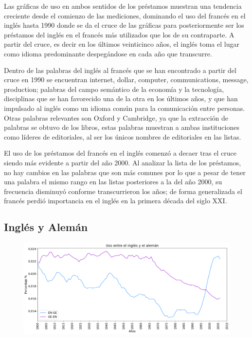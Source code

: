 Las gráficas de uso en ambos sentidos de los préstamos muestran una tendencia creciente desde el comienzo de las mediciones,  dominando el uso del francés en el inglés hasta 1990 donde se da el cruce de las gráficas para posteriormente ser los préstamos del inglés en el francés más utilizados que los de su contraparte.  A partir del cruce, es decir en los últimos veinticinco años, el inglés toma el lugar como idioma predominante despegándose en cada año que transcurre. 

Dentro de las palabras del inglés al francés que se han encontrado a partir del cruce en 1990 se encuentran internet, dollar, computer, communications, message, production;  palabras del campo semántico de la economía y la tecnología, disciplinas que se han favorecido una de la otra en los últimos años, y que han impulsado al inglés como un idioma común para la comunicación entre personas.  Otras palabras relevantes son Oxford y Cambridge,  ya que la extracción de palabras se obtuvo de los libros,  estas palabras muestran a ambas instituciones como líderes de editoriales, al ser los únicos nombres de editoriales en las listas.                         

El uso de los préstamos del francés en el inglés comenzó  a decaer tras el cruce siendo más evidente a partir del año 2000. Al analizar la lista de los préstamos, no hay cambios en las palabras que son más comunes por lo que a pesar de tener una palabra el mismo rango en las listas posteriores a la del año 2000,  su frecuencia disminuyó conforme transcurrieron los años; de forma generalizada el francés perdió importancia en el inglés en la primera década del siglo XXI.


\newpage
\subsection{Inglés y Alemán}

\begin{figure}[h!]
	\centering
	\includegraphics[scale=.38]{Cap_3/SF_2_S2_EN.png}
	\label{SF_EG}
	\caption{}
\end{figure}

